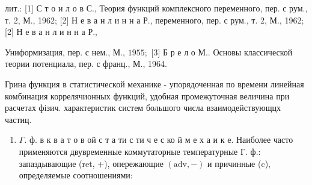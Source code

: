 \documentclass[10pt]{article}
\begin{document}
лит.: [1] С т о и л о в С., Теория функций комплексного переменного, пер. с рум., т. 2, М., 1962; [2] Н е в а н л и н н а Р., переменного, пер. с рум., т. 2, М., 1962; [2] Н е в а н л и н н а Р.,

Униформизация, пер. с нем., М., $1955 ;$ [3] Б р е л о М.. Основы классической теории потенциала, пер. с франц., М., 1964.



Грина функция в статистической механике - упорядоченная по времени линейная комбинация коррелячионных функций, удобная промежуточная величина при расчетах фізич. характеристик систем большого числа взаимодействующцх частиц.



\begin{enumerate}

  \item $\Gamma$. ф. в к в а т о в ой с т а ти с ти ч е с ко й м е х а и к е. Наиболее часто применяются двувременные коммутаторные температурные Г. ф.: запаздывающие (ret, +), опережающие $(\mathrm{adv},-)$ и причинные (c), определяемые соотношениями:

\end{enumerate}
\end{document}
